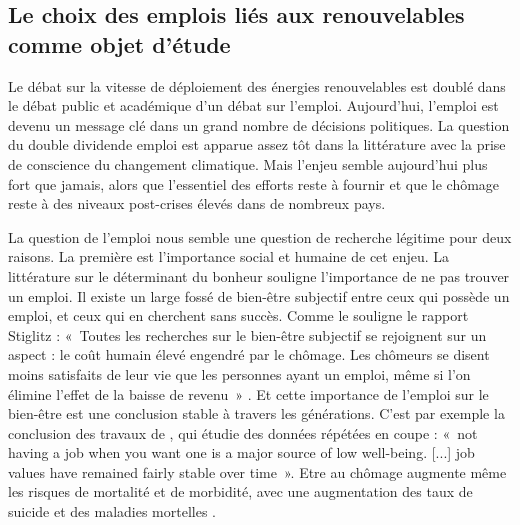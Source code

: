\subsection{Le choix des emplois liés aux renouvelables comme objet d’étude}
Le débat sur la vitesse de déploiement des énergies renouvelables est doublé dans le débat public et académique d’un débat sur l’emploi. Aujourd’hui, l’emploi est devenu un message clé dans un grand nombre de décisions politiques. 
La question du double dividende emploi est apparue assez tôt dans la littérature avec la prise de conscience du changement climatique. Mais l’enjeu semble aujourd’hui plus fort que jamais, alors que l’essentiel des efforts reste à fournir et que le chômage reste à des niveaux post-crises élevés dans de nombreux pays.

La question de l’emploi nous semble une question de recherche légitime pour deux raisons. La première est l’importance social et humaine de cet enjeu. La littérature sur le déterminant du bonheur souligne l’importance de ne pas trouver un emploi. Il existe un large fossé de bien-être subjectif entre ceux qui possède un emploi, et ceux qui en cherchent sans succès. Comme le souligne le rapport Stiglitz : 
«~Toutes les recherches sur le bien-être subjectif se rejoignent sur un aspect : le coût humain élevé engendré par le chômage. Les chômeurs se disent moins satisfaits de leur vie que les personnes ayant un emploi, même si l'on élimine l'effet de la baisse de revenu~» \citep[p. 166]{Stiglitz2009}.
Et cette importance de l’emploi sur le bien-être est une conclusion stable à travers les générations. C'est par exemple la conclusion des travaux de \citet{Clark2009}, qui étudie des données répétées en coupe :
«~not having a job when you want one is a major source of low well-being. [...] job values have remained fairly stable over time~». 
Etre au chômage augmente même les risques de mortalité et de morbidité, avec une augmentation des taux de suicide et des maladies mortelles \citep{Gerdtham2003}.


